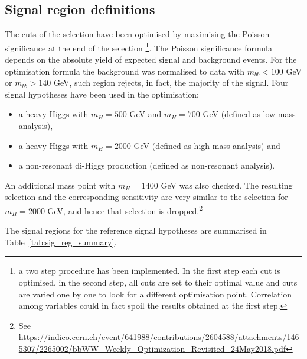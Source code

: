 \subsection{Signal region definitions}
\label{subsec:SR}
The cuts of the selection have been optimised by maximising the Poisson
significance at the end of the selection \footnote{a two step procedure has
been implemented. In the first step each cut is optimised, in the second step,
all cuts are set to their optimal value and cuts are varied one by one to
look for a different optimisation point. Correlation among variables 
could in fact spoil the results obtained at the first step.}. The Poisson
significance formula depends on the absolute yield of expected signal and
background events. For the optimisation formula the \ttbar background was
normalised to data with $m_{bb} < 100$ GeV or $m_{bb} > 140$ GeV, 
such region rejects, in fact, the majority of the signal. Four signal
hypotheses have been used in the optimisation:
\begin{itemize}
\item{ a heavy Higgs with $m_H = 500$ GeV and $m_H = 700$ GeV (defined as low-mass analysis)},
\item{ a heavy Higgs with $m_H = 2000$ GeV (defined as high-mass analysis) and}
\item{ a non-resonant di-Higgs production (defined as non-resonant analysis).}
\end{itemize}
An additional mass point with $m_H = 1400$ GeV was also checked. The resulting selection and the corresponding sensitivity are very similar to the selection for $m_H = 2000$ GeV, and hence that selection is dropped.{\footnote {See \url {https://indico.cern.ch/event/641988/contributions/2604588/attachments/1465307/2265002/bbWW_Weekly_Optimization_Revisited_24May2018.pdf}}} 

The signal regions for the  reference signal hypotheses are summarised in 
Table~\ref{tab:sig_reg_summary}.


